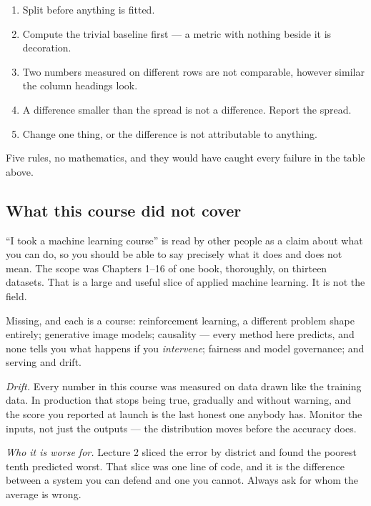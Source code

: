 \documentclass[11pt,a4paper]{article}
\begin{document}
\begin{keybox}[title={What did not change, in twenty-four lectures}]
\begin{enumerate}[leftmargin=1.6em,itemsep=1pt]
  \item Split before anything is fitted.
  \item Compute the trivial baseline first --- a metric with nothing beside it
        is decoration.
  \item Two numbers measured on different rows are not comparable, however
        similar the column headings look.
  \item A difference smaller than the spread is not a difference. Report the
        spread.
  \item Change one thing, or the difference is not attributable to anything.
\end{enumerate}
Five rules, no mathematics, and they would have caught every failure in the
table above.
\end{keybox}

\subsection{What this course did not cover}

``I took a machine learning course'' is read by other people as a claim about
what you can do, so you should be able to say precisely what it does and does
not mean. The scope was Chapters 1--16 of one book, thoroughly, on thirteen
datasets. That is a large and useful slice of applied machine learning. It is
not the field.

Missing, and each is a course: reinforcement learning, a different problem
shape entirely; generative image models; causality --- every method here
predicts, and none tells you what happens if you \emph{intervene}; fairness and
model governance; and serving and drift.

\begin{keybox}[title={The two you are most likely to need first}]
\emph{Drift.} Every number in this course was measured on data drawn like the
training data. In production that stops being true, gradually and without
warning, and the score you reported at launch is the last honest one anybody
has. Monitor the inputs, not just the outputs --- the distribution moves before
the accuracy does.

\emph{Who it is worse for.} Lecture 2 sliced the error by district and found
the poorest tenth predicted worst. That slice was one line of code, and it is
the difference between a system you can defend and one you cannot. Always ask
for whom the average is wrong.
\end{keybox}
\end{document}
